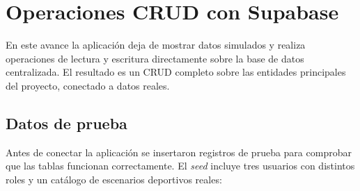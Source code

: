 
\section{Operaciones CRUD con Supabase}

En este avance la aplicaci\'on deja de mostrar datos simulados y realiza
operaciones de lectura y escritura directamente sobre la base de datos
centralizada. El resultado es un CRUD completo sobre las entidades
principales del proyecto, conectado a datos reales.

\subsection{Datos de prueba}

Antes de conectar la aplicaci\'on se insertaron registros de prueba para
comprobar que las tablas funcionan correctamente. El \textit{seed}
incluye tres usuarios con distintos roles y un cat\'alogo de escenarios
deportivos reales:

\begin{table}[H]
  \centering
  \caption{Usuarios de prueba del \textit{seed}}
\end{table}

